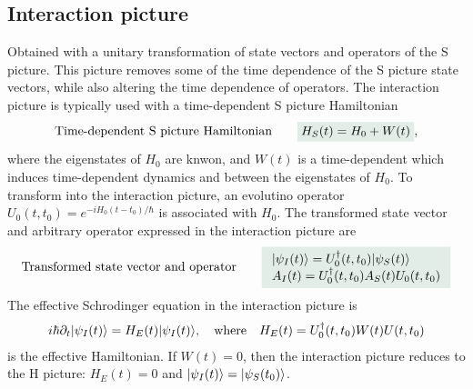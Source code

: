\subsection{Interaction picture}
Obtained with a unitary transformation of state vectors and operators of the S picture.
This picture removes some of the time dependence of the S picture state vectors, while also altering the time dependence of operators. 
The interaction picture is typically used with a time-dependent S picture Hamiltonian 
\begin{align}
    \text{Time-dependent S picture Hamiltonian}\qquad\highlight{H_S(t)=H_0+W(t)},
\end{align}
where the eigenstates of $H_0$ are knwon, and $W(t)$ is a time-dependent  which induces time-dependent dynamics and 
between the eigenstates of $H_0$. To transform into the interaction picture, an evolutino operator $U_0(t,t_0)=e^{-iH_0(t-t_0)/\hbar}$ is associated with $H_0$.
The transformed state vector and arbitrary operator expressed in the interaction picture are 
\begin{align}
    \text{Transformed state vector and operator}\qquad\highlight{\begin{array}{l}
        \ket{\psi_I(t)}=U_0^\dagger(t,t_0)\ket{\psi_S(t)}\\
        A_I(t)=U^\dagger_0(t,t_0)A_S(t)U_0(t,t_0)
    \end{array}}
\end{align}
The effective Schrodinger equation in the interaction picture is 
\begin{align}
    i\hbar\partial_t|\psi_I(t)\rangle=H_E(t)|\psi_I(t)\rangle,\quad\text{where}\quad H_E(t)=U^\dagger_0(t,t_0)W(t)U(t,t_0)
\end{align}
is the effective Hamiltonian. If $W(t)=0$, then the interaction picture reduces to the H picture: $H_E(t)=0$ and $|\psi_I(t)\rangle=|\psi_S(t_0)\rangle$.

